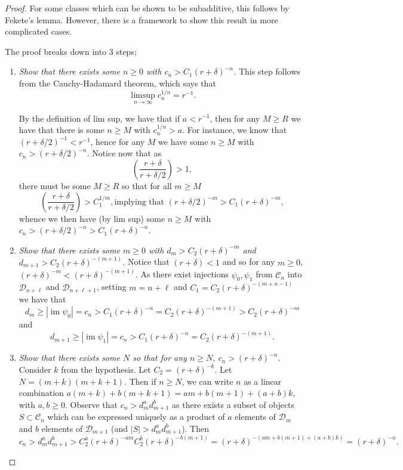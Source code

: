 \documentclass[amsmath,longbibliography,secnumarabic,floatfix,amssymb,nofootinbib,nobibnotes,letterpaper,11pt,tightenlines,notitlepage,showkeys,showlabels]{amsart}%
\newcommand{\ArbClass}{\mathscr{C}}
\newcommand{\ArbSubClass}{\mathscr{D}}
\newcommand{\arbsubclass}{d}
\newcommand{\arbclass}{c}
\DeclareMathOperator{\im}{im}
\begin{document}
\begin{proof}
  For some classes which can be shown to be subadditive, this follows
  by Fekete's lemma. However, there is a framework to show this result
  in more complicated cases.

The proof breaks down into 3 steps;
\begin{enumerate}
\item \emph{Show that there exists some $n \ge 0$ with $\arbclass_n > C_1(r + \delta)^{-n}$.} This
  step follows from the Cauchy-Hadamard theorem, which says that
  \[ \limsup_{n\to\infty}{\arbclass_n^{1/n}} = r^{-1}. \]

  By the definition of lim sup, we have that if $a < r^{-1}$, then for
  any $M \ge R$ we have that there is some $n \ge M$ with
  $\arbclass_n^{1/n} > a$. For instance, we know that $(r +
  \delta/2)^{-1} < r^{-1}$, hence for any $M$ we have some $n \ge M$
  with $\arbclass_n > (r+\delta/2)^{-n}$. Notice now that as
  \[ \left( \frac{r+\delta}{r + \delta/2} \right) > 1, \] there must
  be some $M \ge R$ so that for all $m \ge M$
  \[ \left( \frac{r+\delta}{r + \delta/2} \right) > C_1^{1/m}, \text{
    implying that } (r + \delta/2)^{-m} > C_1(r + \delta)^{-m}, \]
  whence we then have (by lim sup) some $n \ge M$ with $c_n >
  (r+\delta/2)^{-n} > C_1(r+\delta)^{-n}$.
\item \emph{Show that there exists some $m \ge 0$ with $\arbsubclass_m
    > C_2(r + \delta)^{-m}$ and $\arbsubclass_{m+1} > C_2(r +
    \delta)^{-(m+1)}$.} Notice that $(r + \delta) < 1$ and so for any
  $m \ge 0$, $(r + \delta)^{-m} < (r+\delta)^{-(m+1 )}$. As there
  exist injections $\psi_0, \psi_1$ from $\ArbClass_n$ into
  $\ArbSubClass_{n+\ell}$ and $\ArbSubClass_{n+\ell+1}$, setting $m =
  n + \ell$ and $C_1 = C_2(r+\delta)^{-(m+n-1)}$ we have that
  \[ \arbsubclass_m \ge |\im \psi_0| = \arbclass_n >
  C_1(r+\delta)^{-n} = C_2(r+\delta)^{-(m+1)} > C_2(r+\delta)^{-m} \]
  and
  \[ \arbsubclass_{m+1} \ge |\im \psi_1| = \arbclass_n > C_1(r+\delta)^{-n} =
  C_2(r+\delta)^{-(m+1)}. \]
\item \emph{Show that there exists some $N$ so that for any $n \ge N$,
    $\arbclass_n > (r + \delta)^{-n}$.} Consider $k$ from the
  hypothesis. Let $C_2 = (r + \delta)^{-k}$. Let $N = (m + k)(m + k +
  1)$. Then if $n \ge N$, we can write $n$ as a linear combination
  $a(m + k) + b(m + k + 1) = am + b(m + 1) + (a+b)k$, with $a, b \ge
  0$. Observe that $c_n > \arbsubclass_m^a\arbsubclass_{m+1}^b$ as
  there exists a subset of objects $S \subset \ArbClass_n$ which can
  be expressed uniquely as a product of $a$ elements of
  $\ArbSubClass_m$ and $b$ elements of $\ArbSubClass_{m+1}$ (and $|S|
  > \arbsubclass_m^a\arbsubclass_{m+1}^b$). Then
  \[ c_n > d_m^ad_{m+1}^b > C_2^a(r+\delta)^{-am}C_2^b(r+\delta)^{-b(m+1)} = (r+\delta)^{-(am +b(m+1)+(a+b)k)} = (r+\delta)^{-n}.\]
\end{enumerate}


\end{proof}
\end{document}

